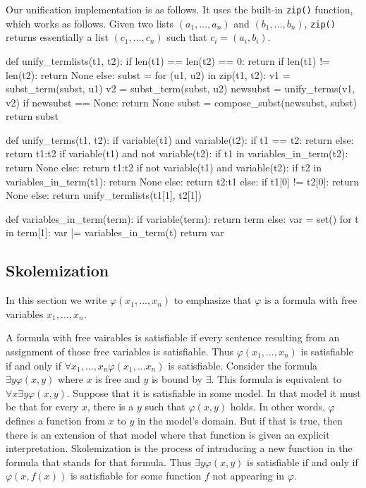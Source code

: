 \documentclass[a4paper,notitlepage]{scrartcl}
\let\phi\varphi
\begin{document}
Our unification implementation is as follows. It uses the built-in
\texttt{zip()} function, which works as follows. Given two lists $(a_1, \ldots,
a_n)$ and $(b_1, \ldots, b_n)$, \texttt{zip()} returns essentially a list
$(c_1, \ldots, c_n)$ such that $c_i = (a_i, b_i)$.

\begin{code}
def unify_termlists(t1, t2):
    if len(t1) == len(t2) == 0:
        return {}
    if len(t1) != len(t2):
        return None
    else:
        subst = {}
        for (u1, u2) in zip(t1, t2):
            v1 = subst_term(subst, u1)
            v2 = subst_term(subst, u2)
            newsubst = unify_terms(v1, v2)
            if newsubst == None:
                return None
            subst = compose_subst(newsubst, subst)
        return subst

def unify_terms(t1, t2):
    if variable(t1) and variable(t2):
        if t1 == t2:
            return {}
        else:
            return {t1:t2}
    if variable(t1) and not variable(t2):
        if t1 in variables_in_term(t2):
            return None
        else:
            return {t1:t2}
    if not variable(t1) and variable(t2):
        if t2 in variables_in_term(t1):
            return None
        else:
            return {t2:t1}
    else:
        if t1[0] != t2[0]:
            return None
        else:
            return unify_termlists(t1[1], t2[1])

def variables_in_term(term):
    if variable(term):
        return {term}
    else:
        var = set()
        for t in term[1]:
            var |= variables_in_term(t)
        return var
\end{code}

\subsection{Skolemization}
In this section we write $\phi(x_1,...,x_n)$ to emphasize that $\phi$ is
   a formula with free variables $x_1,...,x_n$.

A formula with free vairables is satisfiable if every sentence resulting
   from an assignment of those free variables is satisfiable.
Thus $\phi(x_1,...,x_n)$ is satisfiable if and only if $\forall x_1,...,
   x_n\phi(x_1,...x_n)$ is satisfiable.
Consider the formula $\exists y \phi(x, y)$ where $x$ is free and $y$
   is bound by $\exists$.
This formula is equivalent to $\forall x\exists y\phi(x, y)$.
Suppose that it is satisfiable in some model.
In that model it must be that for every $x$, there is a $y$ such 
   that $\phi(x,y)$ holds.
In other words, $\phi$ defines a function from $x$ to $y$ in the model's
   domain.
But if that is true, then there is an extension of that model where
   that function is given an explicit interpretation.
Skolemization is the process of intruducing a new function in the formula
   that stands for that formula.
Thus $\exists y\phi(x, y)$ is satisfiable if and only
   if $\phi(x, f(x))$ is satisfiable for some function $f$ not appearing
   in $\phi$.
\end{document}
